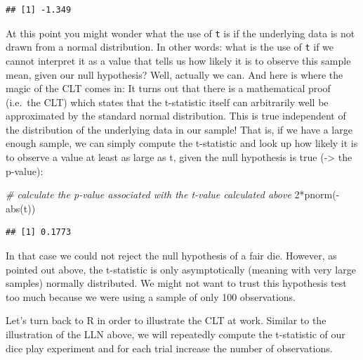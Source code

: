 \documentclass[
  12pt,
]{style/krantz}
\newenvironment{Shaded}{\begin{snugshade}}{\end{snugshade}}
\newcommand{\CommentTok}[1]{\textcolor[rgb]{0.56,0.35,0.01}{\textit{#1}}}
\newcommand{\DecValTok}[1]{\textcolor[rgb]{0.00,0.00,0.81}{#1}}
\newcommand{\FunctionTok}[1]{\textcolor[rgb]{0.00,0.00,0.00}{#1}}
\newcommand{\NormalTok}[1]{#1}
\newcommand{\SpecialCharTok}[1]{\textcolor[rgb]{0.00,0.00,0.00}{#1}}
\begin{document}
\begin{verbatim}
## [1] -1.349
\end{verbatim}

At this point you might wonder what the use of \texttt{t} is if the underlying data is not drawn from a normal distribution. In other words: what is the use of \texttt{t} if we cannot interpret it as a value that tells us how likely it is to observe this sample mean, given our null hypothesis? Well, actually we can. And here is where the magic of the CLT comes in: It turns out that there is a mathematical proof (i.e.~the CLT) which states that the t-statistic itself can arbitrarily well be approximated by the standard normal distribution. This is true independent of the distribution of the underlying data in our sample! That is, if we have a large enough sample, we can simply compute the t-statistic and look up how likely it is to observe a value at least as large as t, given the null hypothesis is true (-\textgreater{} the p-value):

\begin{Shaded}
\begin{Highlighting}[]
\CommentTok{\# calculate the p{-}value associated with the t{-}value calculated above}
\DecValTok{2}\SpecialCharTok{*}\FunctionTok{pnorm}\NormalTok{(}\SpecialCharTok{{-}}\FunctionTok{abs}\NormalTok{(t))}
\end{Highlighting}
\end{Shaded}

\begin{verbatim}
## [1] 0.1773
\end{verbatim}

In that case we could not reject the null hypothesis of a fair die. However, as pointed out above, the t-statistic is only asymptotically (meaning with very large samples) normally distributed. We might not want to trust this hypothesis test too much because we were using a sample of only 100 observations.

Let's turn back to R in order to illustrate the CLT at work. Similar to the illustration of the LLN above, we will repeatedly compute the t-statistic of our dice play experiment and for each trial increase the number of observations.
\end{document}
